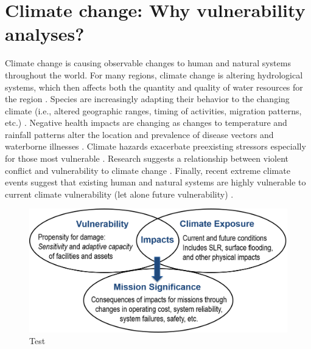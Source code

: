 \documentclass[10pt]{amsart}
\begin{document}
\section{Climate change: Why vulnerability analyses?}
Climate change is causing observable changes to human and natural systems throughout the world.
For many regions, climate change is altering hydrological systems, which then affects both the quantity and quality of water resources for the region \parencite{field2014summary}.
Species are increasingly adapting their behavior to the changing climate (i.e., altered geographic ranges, timing of activities, migration patterns, etc.) \parencite{field2014summary}.
Negative health impacts are changing as changes to temperature and rainfall patterns alter the location and prevalence of disease vectors and waterborne illnesses \parencite{field2014summary}.
Climate hazards exacerbate preexisting stressors especially for those most vulnerable \parencite{field2014summary}.
Research suggests a relationship between violent conflict and vulnerability to climate change \parencite{field2014summary}.
Finally, recent extreme climate events suggest that existing human and natural systems are highly vulnerable to current climate vulnerability (let alone future vulnerability) \parencite{field2014summary}.

\begin{figure}[H]\label{fig:impacts}
\includegraphics[width=12cm]{impacts.png}
\caption{Test}
\end{figure}
\end{document}
